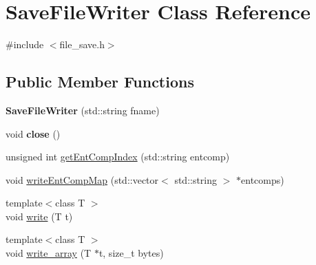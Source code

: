 \hypertarget{class_save_file_writer}{}\section{Save\+File\+Writer Class Reference}
\label{class_save_file_writer}


{\ttfamily \#include $<$file\+\_\+save.\+h$>$}

\subsection*{Public Member Functions}
\begin{DoxyCompactItemize}
\item 
\mbox{\label{class_save_file_writer_afc1540e5b1b66a18f8d3ed78d7013748}} 
{\bfseries Save\+File\+Writer} (std\+::string fname)
\item 
\mbox{\label{class_save_file_writer_a0c174fe28dc4070a9c71c78ede21a91c}} 
void {\bfseries close} ()
\item 
unsigned int \hyperlink{class_save_file_writer_aa5f3b020a4d93f42f274d4c5d7f10b8c}{get\+Ent\+Comp\+Index} (std\+::string entcomp)
\item 
void \hyperlink{class_save_file_writer_a3b6359fa30469f5ae518eaf009951e05}{write\+Ent\+Comp\+Map} (std\+::vector$<$ std\+::string $>$ $\ast$entcomps)
\item 
{\footnotesize template$<$class T $>$ }\\void \hyperlink{class_save_file_writer_a665e53cc0c04489c5b0872b3f8cd7218}{write} (T t)
\item 
{\footnotesize template$<$class T $>$ }\\void \hyperlink{class_save_file_writer_a314ad7bcf58b24885ec3501d2fa206e5}{write\+\_\+array} (T $\ast$t, size\+\_\+t bytes)
\end{DoxyCompactItemize}


